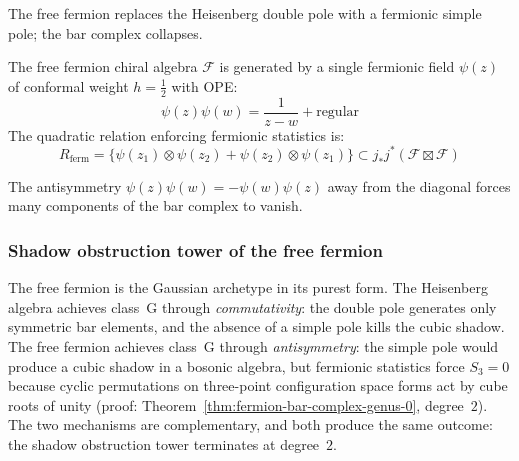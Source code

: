The free fermion replaces the Heisenberg double pole with a fermionic simple pole; the bar complex collapses.

\begin{definition}
The free fermion chiral algebra $\mathcal{F}$ is generated by a single fermionic field $\psi(z)$ of
conformal weight $h = \frac{1}{2}$ with OPE:
\[
\psi(z)\psi(w) = \frac{1}{z-w} + \text{regular}
\]
The quadratic relation enforcing fermionic statistics is:
\[
R_{\text{ferm}} = \{\psi(z_1) \otimes \psi(z_2) + \psi(z_2) \otimes \psi(z_1)\} \subset
j_*j^*(\mathcal{F} \boxtimes \mathcal{F})
\]
\end{definition}

\begin{remark}
The antisymmetry $\psi(z)\psi(w) = -\psi(w)\psi(z)$ away from the diagonal forces many components of the bar complex to vanish.
\end{remark}

\subsubsection{Shadow obstruction tower of the free fermion}
\label{sec:fermion-shadow-tower}%
%

The free fermion is the Gaussian archetype in its purest form. The
Heisenberg algebra achieves class~G through \emph{commutativity}: the
double pole generates only symmetric bar elements, and the absence of
a simple pole kills the cubic shadow. The free fermion achieves class~G
through \emph{antisymmetry}: the simple pole would produce a cubic
shadow in a bosonic algebra, but fermionic statistics force $S_3 = 0$
because cyclic permutations on three-point configuration space forms
act by cube roots of unity (proof:
Theorem~\ref{thm:fermion-bar-complex-genus-0}, degree~$2$). The two
mechanisms are complementary, and both produce the same outcome: the
shadow obstruction tower terminates at degree~$2$.

